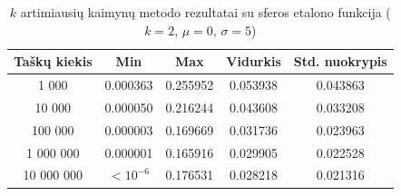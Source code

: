 \begin{table}[H]
    \centering
    \begin{tabular}{|c|c|c|c|c|}
        \hline
        \textbf{Taškų kiekis} & \textbf{Min} & \textbf{Max} & \textbf{Vidurkis} & \textbf{Std. nuokrypis} \\ \hline
        1 000        & 0.000363 & 0.255952 & 0.053938 & 0.043863 \\ \hline
        10 000       & 0.000050 & 0.216244 & 0.043608 & 0.033208 \\ \hline
        100 000      & 0.000003 & 0.169669 & 0.031736 & 0.023963 \\ \hline
        1 000 000    & 0.000001 & 0.165916 & 0.029905 & 0.022528 \\ \hline
        10 000 000   & $<10^{-6}$ & 0.176531 & 0.028218 & 0.021316 \\ \hline
    \end{tabular}
    \caption{$k$ artimiausių kaimynų metodo rezultatai su sferos etalono funkcija ($k = 2$, $\mu = 0$, $\sigma = 5$)}
\end{table}